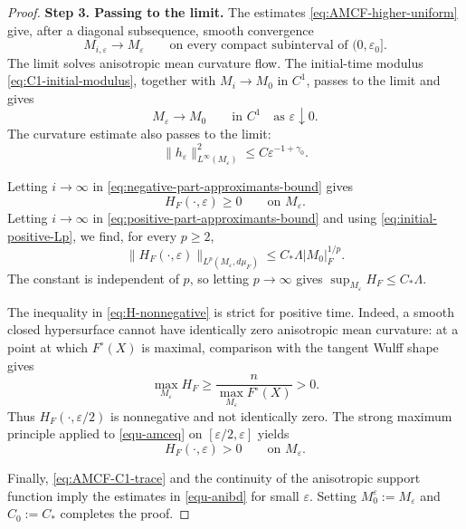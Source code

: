 \documentclass[10pt,a4paper]{amsart}
\numberwithin{equation}{section}
\begin{document}
\begin{proof}
\medskip
\noindent
\textbf{Step 3. Passing to the limit.}
The estimates \eqref{eq:AMCF-higher-uniform} give, after a diagonal subsequence, smooth convergence
\begin{equation*}
 M_{i,\varepsilon}\longrightarrow M_\varepsilon
 \qquad\text{on every compact subinterval of }(0,\varepsilon_0].
\end{equation*}
The limit solves anisotropic mean curvature flow. The initial-time modulus \eqref{eq:C1-initial-modulus}, together with $M_i\to M_0$ in $C^1$, passes to the limit and gives
\begin{equation}
\label{eq:AMCF-C1-trace}
 M_\varepsilon\longrightarrow M_0
 \qquad\text{in }C^1\quad\text{as }\varepsilon\downarrow0.
\end{equation}
The curvature estimate also passes to the limit:
\begin{equation*}
 \|h_\varepsilon\|_{L^\infty(M_\varepsilon)}^2
 \leq C\varepsilon^{-1+\gamma_0}.
\end{equation*}

Letting $i\to\infty$ in \eqref{eq:negative-part-approximants-bound} gives
\begin{equation}
\label{eq:H-nonnegative}
 H_F(\cdot,\varepsilon)\geq0
 \qquad\text{on }M_\varepsilon.
\end{equation}
Letting $i\to\infty$ in \eqref{eq:positive-part-approximants-bound} and using \eqref{eq:initial-positive-Lp}, we find, for every $p\geq2$,
\begin{equation*}
 \|H_F(\cdot,\varepsilon)\|_{L^p(M_\varepsilon,d\mu_F)}
 \leq C_*\Lambda |M_0|_F^{1/p}.
\end{equation*}
The constant is independent of $p$, so letting $p\to\infty$ gives $\sup_{M_\varepsilon}H_F\leq C_*\Lambda$. 

The inequality in \eqref{eq:H-nonnegative} is strict for positive time. Indeed, a smooth closed hypersurface cannot have identically zero anisotropic mean curvature: at a point at which $F^\circ(X)$ is maximal, comparison with the tangent Wulff shape gives
\begin{equation*}
 \max_{M_\varepsilon}H_F
 \geq\frac{n}{\max_{M_\varepsilon}F^\circ(X)}>0.
\end{equation*}
Thus $H_F(\cdot,\varepsilon/2)$ is nonnegative and not identically zero. The strong maximum principle applied to \eqref{equ-amceq} on $[\varepsilon/2,\varepsilon]$ yields
\begin{equation*}
 H_F(\cdot,\varepsilon)>0
 \qquad\text{on }M_\varepsilon.
\end{equation*}

Finally, \eqref{eq:AMCF-C1-trace} and the continuity of the anisotropic support function imply the estimates in \eqref{equ-anibd} for small $\varepsilon$. Setting $M_0^\varepsilon:=M_\varepsilon$ and $C_0:=C_*$ completes the proof.
\end{proof}
\end{document}
